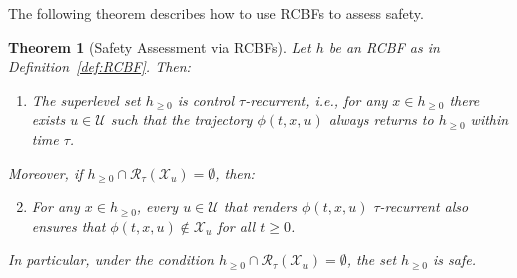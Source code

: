 \documentclass[letterpaper, 10 pt, conference]{ieeeconf}
\newtheorem{theorem}{Theorem}
\newcommand{\X}{\mathcal{X}}
\newcommand{\U}{\mathcal{U}}
\begin{document}
The following theorem describes how to use RCBFs to assess safety.
\begin{theorem}[Safety Assessment via RCBFs]
\label{theo:safety_assessment}
Let $h$ be an RCBF as in Definition~\ref{def:RCBF}. Then:
\begin{enumerate}[label=(\roman*)]
    \item The superlevel set $h_{\ge 0}$ is control $\tau$-recurrent, i.e., for any $x \in h_{\ge 0}$ there exists $u \in \U$ such that the trajectory $\phi(t,x,u)$ always returns to $h_{\ge 0}$ within time $\tau$.
\end{enumerate}
Moreover, if $h_{\ge 0} \cap \mathcal{R}_\tau(\mathcal{X}_u)=\emptyset$, then:
\begin{enumerate}[label=(\roman*)]
 \setcounter{enumi}{1}
    \item For any $x \in h_{\ge 0}$, every $u \in \U$ that renders $\phi(t,x,u)$ $\tau$-recurrent also ensures that $\phi(t,x,u)\notin \X_u$ for all $t\geq0$. 
\end{enumerate}
In particular, under the condition $h_{\ge 0} \cap \mathcal{R}_\tau(\mathcal{X}_u)=\emptyset$, the set $h_{\ge 0}$ is safe.
\end{theorem}
\end{document}
